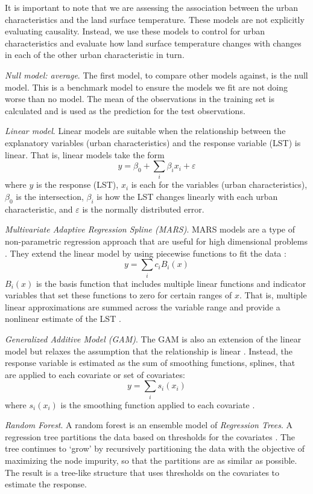 \documentclass[review]{elsarticle}
\begin{document}
It is important to note that we are assessing the association between the urban characteristics and the land surface temperature.
These models are not explicitly evaluating causality. 
Instead, we use these models to control for urban characteristics and evaluate how land surface temperature changes with changes in each of the other urban characteristic in turn.

\textit{Null model: average}. The first model, to compare other models against, is the null model. 
This is a benchmark model to ensure the models we fit are not doing worse than no model.
The mean of the observations in the training set is calculated and is used as the prediction for the test observations.

\textit{Linear model}. Linear models are suitable when the relationship between the explanatory variables (urban characteristics) and the response variable (LST) is linear. 
That is, linear models take the form $$ y = \beta_0 + \sum_i \beta_i x_i + \varepsilon$$ where $y$ is the response (LST), $x_i$ is each for the variables (urban characteristics), $\beta_0$ is the intersection, $\beta_i$ is how the LST changes linearly with each urban characteristic, and $\varepsilon$ is the normally distributed error.

\textit{Multivariate Adaptive Regression Spline (MARS)}. 
MARS models are a type of non-parametric regression approach that are useful for high dimensional problems \cite{Hastie2009-ky}. 
They extend the linear model by using piecewise functions to fit the data \cite{Friedman1991-of}: $$ y = \sum_i c_i B_i(x)$$
$B_i(x)$ is the basis function that includes multiple linear functions and indicator variables that set these functions to zero for certain ranges of $x$.
That is, multiple linear approximations are summed across the variable range and provide a nonlinear estimate of the LST \cite{Friedman1991-of}. 

\textit{Generalized Additive Model (GAM)}. 
The GAM is also an extension of the linear model but relaxes the assumption that the relationship is linear \cite{Hastie1990-cg}.
Instead, the response variable is estimated as the sum of smoothing functions, splines, that are applied to each covariate or set of covariates: $$ y = \sum_i s_i(x_i)$$ where $s_i(x_i)$ is the smoothing function applied to each covariate \cite{Shortridge2015-ub}.

\textit{Random Forest}. A random forest is an ensemble model of \textit{Regression Trees}. 
A regression tree partitions the data based on thresholds for the covariates \cite{Breiman1984-hw}. 
The tree continues to `grow' by recursively partitioning the data with the objective of maximizing the node impurity, so that the partitions are as similar as possible. 
The result is a tree-like structure that uses thresholds on the covariates to estimate the response.
\end{document}
